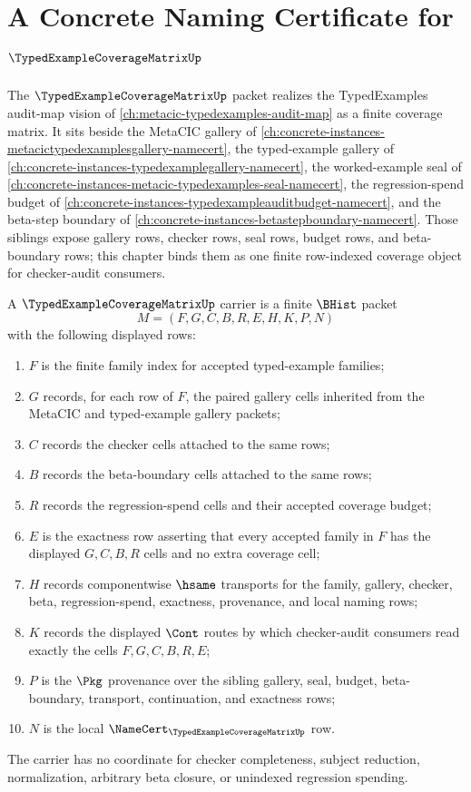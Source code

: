 \chapter{A Concrete Naming Certificate for $\TypedExampleCoverageMatrixUp$}
\label{ch:concrete-instances-typedexamplecoveragematrix-namecert}

The $\TypedExampleCoverageMatrixUp$ packet realizes the TypedExamples audit-map vision of \autoref{ch:metacic-typedexamples-audit-map} as a finite coverage matrix. It sits beside the MetaCIC gallery of \autoref{ch:concrete-instances-metacictypedexamplesgallery-namecert}, the typed-example gallery of \autoref{ch:concrete-instances-typedexamplegallery-namecert}, the worked-example seal of \autoref{ch:concrete-instances-metacic-typedexamples-seal-namecert}, the regression-spend budget of \autoref{ch:concrete-instances-typedexampleauditbudget-namecert}, and the beta-step boundary of \autoref{ch:concrete-instances-betastepboundary-namecert}. Those siblings expose gallery rows, checker rows, seal rows, budget rows, and beta-boundary rows; this chapter binds them as one finite row-indexed coverage object for checker-audit consumers.

\begin{definition}
\label{def:typed-example-coverage-matrix-carrier}
A $\TypedExampleCoverageMatrixUp$ carrier is a finite $\BHist$ packet
$$
M=(F,G,C,B,R,E,H,K,P,N)
$$
with the following displayed rows:
\begin{enumerate}
\item $F$ is the finite family index for accepted typed-example families;
\item $G$ records, for each row of $F$, the paired gallery cells inherited from the MetaCIC and typed-example gallery packets;
\item $C$ records the checker cells attached to the same rows;
\item $B$ records the beta-boundary cells attached to the same rows;
\item $R$ records the regression-spend cells and their accepted coverage budget;
\item $E$ is the exactness row asserting that every accepted family in $F$ has the displayed $G,C,B,R$ cells and no extra coverage cell;
\item $H$ records componentwise $\hsame$ transports for the family, gallery, checker, beta, regression-spend, exactness, provenance, and local naming rows;
\item $K$ records the displayed $\Cont$ routes by which checker-audit consumers read exactly the cells $F,G,C,B,R,E$;
\item $P$ is the $\Pkg$ provenance over the sibling gallery, seal, budget, beta-boundary, transport, continuation, and exactness rows;
\item $N$ is the local $\NameCert_{\TypedExampleCoverageMatrixUp}$ row.
\end{enumerate}
The carrier has no coordinate for checker completeness, subject reduction, normalization, arbitrary beta closure, or unindexed regression spending.
\end{definition}

